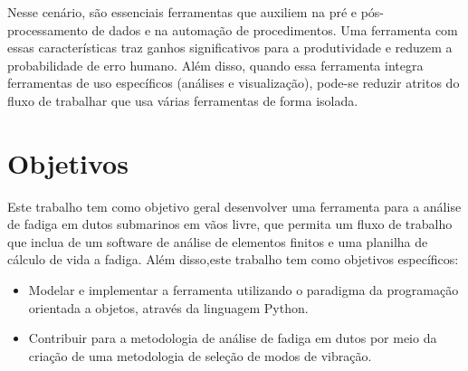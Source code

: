 Nesse cenário, são essenciais ferramentas que auxiliem na pré e pós-processamento de dados e na automação de procedimentos. Uma ferramenta com essas características traz ganhos significativos para a produtividade e reduzem a probabilidade de erro humano. Além disso, quando essa ferramenta integra ferramentas de uso específicos (análises e visualização), pode-se reduzir atritos do fluxo de trabalhar que usa várias ferramentas de forma isolada.

\section{Objetivos}

Este trabalho tem como objetivo geral desenvolver uma ferramenta para a análise de fadiga em dutos submarinos em vãos livre, que permita um fluxo de trabalho que inclua de um software de análise de elementos finitos e uma planilha de cálculo de vida a fadiga. Além disso,este trabalho tem como objetivos específicos:

\begin{itemize}
    \item Modelar e implementar a ferramenta utilizando o paradigma da programação orientada a objetos, através da linguagem Python.
    \item Contribuir para a metodologia de análise de fadiga em dutos por meio da criação de uma metodologia de seleção de modos de vibração.
\end{itemize}